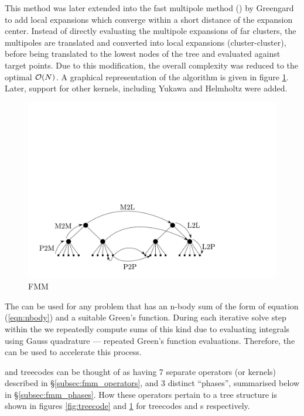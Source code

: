 This method was later extended into the fast multipole method ({\fmm}) by Greengard \cite{greengard1987} to add local expansions which converge within a short distance of the expansion center. Instead of directly evaluating the multipole expansions of far clusters, the multipoles are translated and converted into local expansions (cluster-cluster), before being translated to the lowest nodes of the tree and evaluated against target points. Due to this modification, the overall complexity was reduced to the optimal $\mathcal{O}(N)$. A graphical representation of the algorithm is given in figure \ref{fig:fmm}. Later, support for other kernels, including Yukawa \cite{Boschitsch99,HuangJiaZhang2009} and Helmholtz \cite{GreengardETal1998} were added.

\begin{figure}[h]
	\centering
	\includegraphics[width=12cm]{img/FMM.pdf}
	\caption{FMM}
	\label{fig:fmm}
\end{figure}

The {\fmm} can be used for any problem that has an n-body sum of the form of equation (\ref{eqn:nbody}) and a suitable Green's function. During each iterative solve step within the {\bem} we repeatedly compute sums of this kind due to evaluating integrals using Gauss quadrature --- repeated Green's function evaluations. Therefore, the {\fmm} can be used to accelerate this process.

{\fmm} and treecodes can be thought of as having 7 separate operators (or kernels) described in \S\ref{subsec:fmm_operators}, and 3 distinct ``phases'', summarised below in \S\ref{subsec:fmm_phases}. How these operators pertain to a tree structure is shown in figures \ref{fig:treecode} and \ref{fig:fmm} for treecodes and {\fmm}s respectively.

